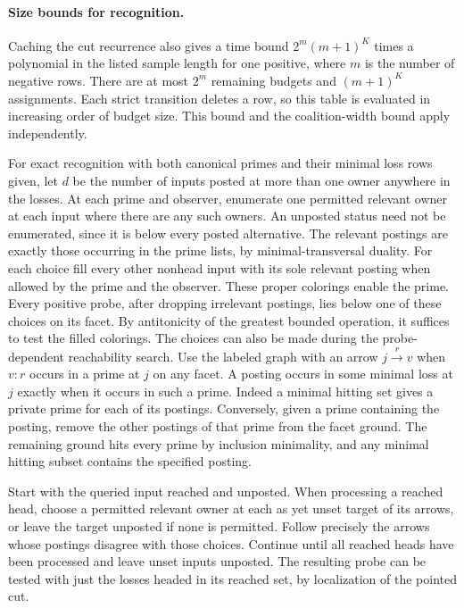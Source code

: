 \paragraph{Size bounds for recognition.}
Caching the cut recurrence also gives a time bound
$2^m(m+1)^K$ times a polynomial in the listed sample
length for one positive, where $m$ is the number of
negative rows. There are at most $2^m$ remaining
budgets and $(m+1)^K$ assignments. Each strict
transition deletes a row, so this table is evaluated
in increasing order of budget size. This bound and
the coalition-width bound apply independently.

For exact recognition with both canonical primes and
their minimal loss rows given, let $d$ be the number
of inputs posted at more than one owner anywhere
in the losses. At each prime and observer, enumerate
one permitted relevant owner at each input where there
are any such owners. An unposted status need not be
enumerated, since it is below every posted alternative.
The relevant postings are exactly those occurring
in the prime lists, by minimal-transversal duality.
For each choice fill every other nonhead input with
its sole relevant posting when allowed by the prime
and the observer. These proper colorings enable the
prime. Every positive probe, after dropping irrelevant
postings, lies below one of these choices on its facet.
By antitonicity of the greatest bounded operation,
it suffices to test the filled colorings. The choices
can also be made during the probe-dependent reachability
search. Use the labeled graph with an arrow
$j\xrightarrow{r}v$ when $v:r$ occurs in a prime at
$j$ on any facet. A posting occurs in some minimal
loss at $j$ exactly when it occurs in such a prime.
Indeed a minimal hitting set gives a private prime
for each of its postings. Conversely, given a prime
containing the posting, remove the other postings
of that prime from the facet ground. The remaining
ground hits every prime by inclusion minimality,
and any minimal hitting subset contains the
specified posting.

Start with the queried input reached and unposted.
When processing a reached head, choose a permitted
relevant owner at each as yet unset target of its
arrows, or leave the target unposted if none is
permitted. Follow precisely the arrows whose
postings disagree with those choices. Continue
until all reached heads have been processed and
leave unset inputs unposted. The resulting probe
can be tested with just the losses headed in its
reached set, by localization of the pointed cut.

